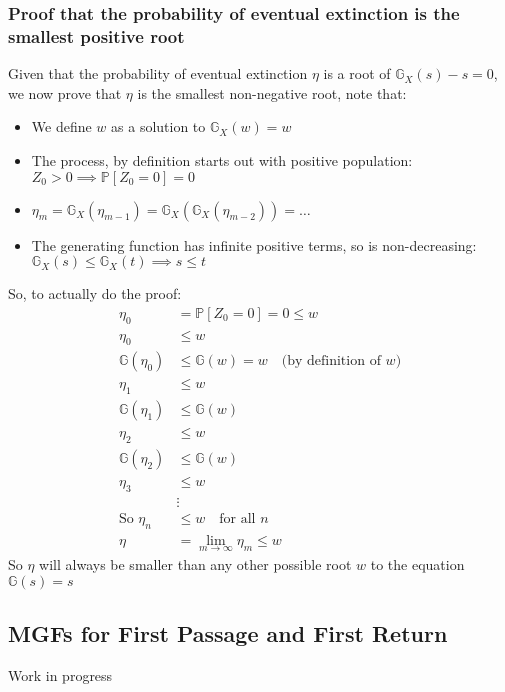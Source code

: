 \documentclass[12pt]{report}
\begin{document}
\subsubsection{Proof that the probability of eventual extinction is the
smallest positive root}
Given that the probability of eventual extinction $\eta$ is a root of $
\mathbb{G}_X(s) - s = 0$, we now prove that $\eta$ is the smallest non-negative
root, note that:
\begin{itemize}
    \item We define $w$ as a solution to $ \mathbb{G}_X(w) = w $
    \item The process, by definition starts out with positive population:
        $Z_{0} > 0 \implies \mathbb{P}\left[Z_{0} = 0\right] = 0$
    \item $\eta_{m} = \mathbb{G}_X(\eta_{m-1}) =
        \mathbb{G}_X(\mathbb{G}_X(\eta_{m-2})) = \dots $
    \item The generating function has infinite positive terms, so
        is non-decreasing: $\mathbb{G}_X(s) \le \mathbb{G}_X(t) \implies s \le t$
\end{itemize}
So, to actually do the proof:
\begin{equation*}
    \begin{aligned}
        \eta_{0} &= \mathbb{P}\left[Z_{0} = 0\right] = 0 \le w \\
        \eta_{0} &\le w \\
        \mathbb{G}(\eta_{0}) &\le \mathbb{G}(w) = w \quad\text{(by definition
        of $w$)} \\
        \eta_{1} &\le w \\
        \mathbb{G}(\eta_{1}) &\le \mathbb{G}(w) \\
        \eta_{2} &\le w \\
        \mathbb{G}(\eta_{2}) &\le \mathbb{G}(w) \\
        \eta_{3} &\le w \\
                             &\vdots\\
        \text{So } \eta_{n} &\le w \quad \text{for all } n\\
        \eta &= \lim_{m \to \infty} \eta_{m} \le w
    \end{aligned}
\end{equation*}
So $\eta$ will always be smaller than any other possible root $w$ to the
equation $ \mathbb{G}(s) = s$

\subsection{MGFs for First Passage and First Return}
Work in progress
\end{document}
